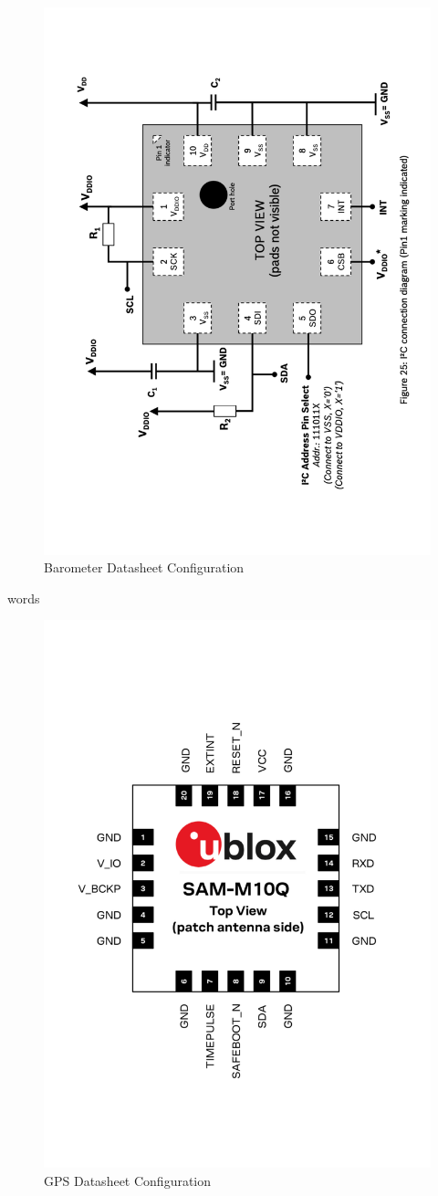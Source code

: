 \documentclass{report}
\begin{document}
            \begin{figure}[H]
                \centering
                \includegraphics[width=0.4\linewidth, angle=270]{figures/BARO_DS.pdf}
                \caption{Barometer Datasheet Configuration}
                \label{fig:baro_ds}
            \end{figure}

            words
            \begin{figure}[H]
                \centering
                \includegraphics[width=0.4\linewidth]{figures/GPS_DS.pdf}
                \caption{GPS Datasheet Configuration}
                \label{fig:gps_ds}
            \end{figure}
\end{document}
